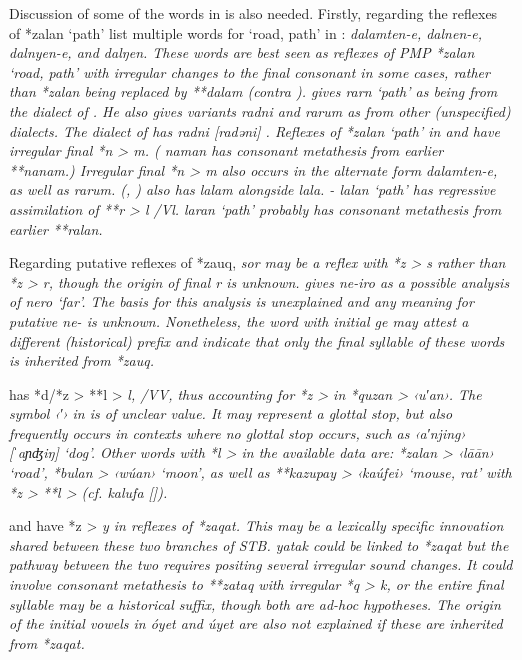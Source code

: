 Discussion of some of the words in  is also needed.
Firstly, regarding the reflexes of *zalan ‘path’
\citet{MettlerMettler1996} list multiple words for ‘road,
path’ in : \it{dalamten-e,
dalnen-e, dalnyen-e,} and \it{dalŋen}.
These words are best seen as reflexes of PMP *zalan ‘road,
path’ with irregular changes to the final consonant in some cases,
rather than *zalan being replaced by **dalam (contra \citealt[276]{Blust1993}).
\citet[226]{Jackson2014} gives  \it{rarn} ‘path’ as being
from the  dialect of .
He also gives variants \it{radni}
and \it{rarum} as from other (unspecified) dialects.
The  dialect of  has \it{radni} [radəni] \citep{Voorhoeve1995b}.
Reflexes of *zalan ‘path’ in 
and  have irregular final *n > \it{m}.
( \it{naman} has consonant metathesis from earlier **nanam.)
Irregular final *n > \it{m} also occurs in the alternate 
form \it{dalamten-e}, as well as  \it{rarum}.
 (, ) also has \it{lalam} alongside \it{lala}.
- \it{lalan} ‘path’ has regressive assimilation of
**r > \it{l} /{\gap}Vl.
 \it{laran} ‘path’ probably has consonant metathesis from earlier **ralan.

Regarding putative reflexes of *zauq,
 \it{sor} may be a reflex with *z > \it{s} rather than
*z > \it{r}, though the origin of final \it{r} is unknown.
\citet[112]{Jackson2014} gives  \it{ne-iro} as a possible
analysis of \it{nero} ‘far’.
The basis for this analysis is unexplained
and any meaning for putative \it{ne-} is unknown.
Nonetheless, the  word with initial \it{ge} may attest a
different (historical) prefix and indicate that only the
final syllable of these words is inherited from *zauq.

 has *d/*z > **l > \it{l,} {\0} /V{\gap}V,
thus accounting for *z > {\0} in *quzan > ‹u′an›.
The symbol ‹′› in \citet{Wallace1869} is of unclear value.
It may represent a glottal stop,
but also frequently occurs in contexts where no glottal stop
occurs, such as  ‹a′njing› [ˈaɲʤiŋ] ‘dog’.
Other  words with *l > {\0} in the available data are: *zalan
> ‹\it{lāān}› ‘road’, *bulan > ‹wúan› ‘moon’,
as well as **kazupay > ‹kaúfei› ‘mouse,
rat’ with *z > **l > {\0} (cf.
 \it{kalufa} [\citealp[144]{Collins1986}]).

 and  have *z > \it{y} in reflexes of *zaqat.
This may be a lexically specific innovation shared between these
two branches of STB.
 \it{yatak} could be linked to *zaqat but the pathway
between the two requires positing several irregular sound changes.
It could involve consonant metathesis to **zataq with irregular
*q > \it{k}, or the entire final syllable may be a historical suffix,
though both are ad-hoc hypotheses.
The origin of the initial vowels in  \it{óyet}
and  \it{úyet} are also not explained if these are inherited from *zaqat.

